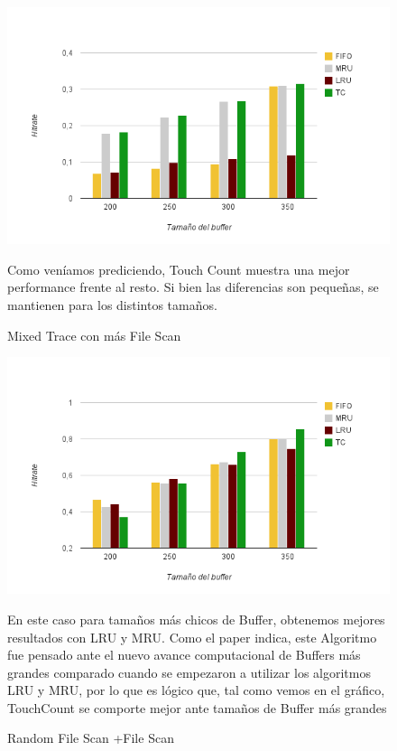 \begin{figure}[ht] %
\includegraphics[scale=.80]{grafico1-1}
\caption{Mixed Trace con más File Scan}
Como veníamos prediciendo, Touch Count muestra una mejor performance frente al resto. 
Si bien las diferencias son pequeñas, se mantienen para los distintos tamaños.
\end{figure}

\begin{figure}[ht]
\includegraphics[scale=.80]{grafico1-2}
\caption{Random File Scan +File Scan}
En este caso para tamaños más chicos de Buffer, obtenemos mejores resultados con LRU y MRU. 
Como el paper indica, este Algoritmo fue pensado ante el nuevo avance computacional
de Buffers más grandes comparado cuando se empezaron a utilizar los algoritmos LRU y MRU, por lo 
que es lógico que, tal como vemos en el gráfico, TouchCount se comporte mejor ante tamaños de Buffer más grandes
\end{figure}


